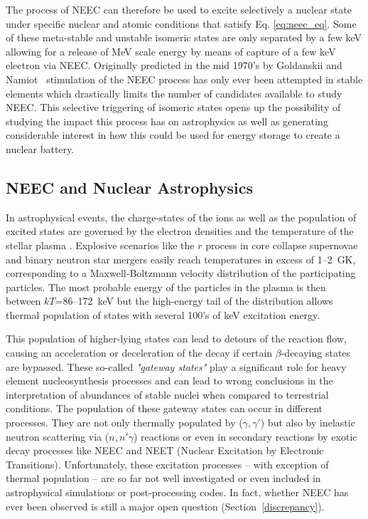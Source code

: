 \documentclass[jon_ringuette_thesis_proposal.tex]{subfiles}
\begin{document}
    The process of NEEC can therefore be used to excite selectively a nuclear state under specific nuclear and atomic conditions that satisfy Eq. \ref{eq:neec_eq}.
    Some of these meta-stable and unstable isomeric states are only separated by a few keV allowing for a release of MeV scale energy by means of capture of a few keV electron via NEEC.
    Originally predicted in the mid 1970's by Goldanskii and Namiot~\cite{Goldanskii1976} stimulation of the NEEC process has only ever been attempted in stable elements which drastically limits the number of candidates available to study NEEC.
    This selective triggering of isomeric states opens up the possibility of studying the impact this process has on astrophysics as well as generating considerable interest in how this could be used for energy storage to create a nuclear battery.



    \subsection{NEEC and Nuclear Astrophysics}

    In astrophysical events, the charge-states of the ions as well as the population of excited states are governed by the electron densities and the temperature of the stellar plasma \cite{eec_SOP_NEEC}.
    Explosive scenarios like the $r$ process in core collapse supernovae and binary neutron star mergers easily reach temperatures in excess of 1--2~GK, corresponding to a Maxwell-Boltzmann velocity distribution of the participating particles.
    The most probable energy of the particles in the plasma is then between $kT$=86--172~keV but the high-energy tail of the distribution allows thermal population of states with several 100's of keV excitation energy.

    This population of higher-lying states can lead to detours of the reaction flow, causing an acceleration or deceleration of the decay if certain $\beta$-decaying states are bypassed.
    These so-called \textit{"gateway states"} play a significant role for heavy element nucleosynthesis processes and can lead to wrong conclusions in the interpretation of abundances of stable nuclei when compared to terrestrial conditions.
    The population of these gateway states can occur in different processes.
    They are not only thermally populated by ($\gamma, \gamma'$) but also by inelastic neutron scattering via ($n,n' \gamma$) reactions or even in secondary reactions by exotic decay processes like NEEC and NEET (Nuclear Excitation by Electronic Transitions).
    Unfortunately, these excitation processes -- with exception of thermal population -- are so far not well investigated or even included in astrophysical simulations or post-processing codes.
    In fact, whether NEEC has ever been observed is still a major open question (Section~\ref{discrepancy}).
\end{document}
